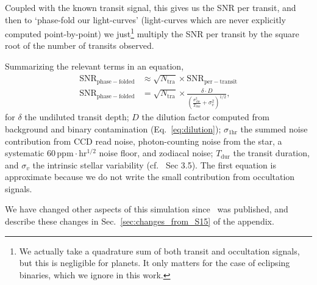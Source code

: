 Coupled with the known transit signal, this gives us 
the SNR per transit, and then to `phase-fold our light-curves' (light-curves 
which are never explicitly computed point-by-point) we just\footnote{We
  actually take a quadrature sum of both transit and occultation
  signals, but this is negligible for planets. It only matters for the
  case of eclipsing binaries, which we ignore in this work.} multiply
the SNR per transit by the square root of the number of transits
observed.

Summarizing the relevant terms in an equation,
\begin{align}
\label{eq:snr} \mathrm{SNR}_\mathrm{phase-folded} &\approx
\sqrt{N_\mathrm{tra}} \times \mathrm{SNR}_\mathrm{per-transit}\nonumber \\
\mathrm{SNR}_\mathrm{phase-folded} &= \sqrt{N_\mathrm{tra}} \times 
\frac{\delta \cdot D}{\left(\frac{\sigma_\mathrm{1hr}^2}{T_\mathrm{dur}} 
	+ \sigma_v^2 \right)^{1/2}}, 
\end{align}
for $\delta$ the undiluted transit depth; $D$ the dilution factor
computed from background and binary contamination (Eq.~\ref{eq:dilution});
$\sigma_\mathrm{1hr}$ the summed noise contribution from CCD read noise, 
photon-counting noise from the star, a systematic 
$60\,\mathrm{ppm\cdot hr^{1/2}}$ noise floor, and zodiacal noise;
$T_\mathrm{dur}$ the transit duration, and $\sigma_v$ the intrinsic
stellar variability (cf.~ Sec 3.5).
The first equation is approximate because we do not write the
small contribution from occultation signals.

We have changed other aspects of this simulation
since~ was published, and describe these
changes in Sec.~\ref{sec:changes_from_S15} of the appendix.
